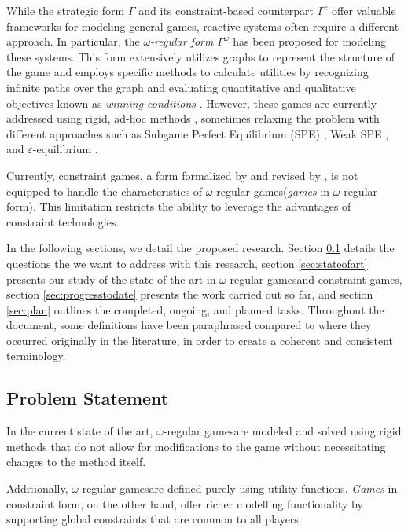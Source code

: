 \documentclass{article}
\makeatletter
\newcommand{\wregularform}{$\omega$-regular form\@ifnextchar{,}{}{\@ifnextchar{.}{}{ }}}
\newcommand{\wregulargames}{$\omega$-regular games\@ifnextchar{,}{}{\@ifnextchar{.}{}{ }}}
\newcommand{\constraintform}{constraint form\@ifnextchar{,}{}{\@ifnextchar{.}{}{ }}}
\newcommand{\constraintgames}{constraint games\@ifnextchar{,}{}{\@ifnextchar{.}{}{ }}}
\makeatother
\begin{document}
While the strategic form $\Gamma$ and its constraint-based counterpart $\Gamma^c$ offer valuable frameworks for modeling general games, reactive systems often require a different approach. In particular, the \textit{\wregularform} $\Gamma^\omega$ \cite{BruyereVeronique2022AGAf} has been proposed for modeling these systems. This form extensively utilizes graphs to represent the structure of the game and employs specific methods to calculate utilities by recognizing infinite paths over the graph and evaluating quantitative and qualitative objectives known as \textit{winning conditions} \cite{ChatterjeeKrishnendu2012Asos, Erich2008SCaA}. However, these games are currently addressed using rigid, ad-hoc methods \cite{SohailSaqib2013Sfat, aggarwal:2023}, sometimes relaxing the problem with different approaches such as Subgame Perfect Equilibrium (SPE) \cite{LéonardBrice2022TCoS}, Weak SPE \cite{BruyereVeronique2021Oteo}, and $\varepsilon$-equilibrium \cite{FleschJános2023Eits}.

Currently, \constraintgames, a form formalized by \cite{nguyen:2015} and revised by \cite{palmieri:2019}, is not equipped to handle the characteristics of \wregulargames (\textit{games} in \wregularform). This limitation restricts the ability to leverage the advantages of constraint technologies.

In the following sections, we detail the proposed research. Section \ref{sec:problemstatement} details the questions the we want to address with this research, section \ref{sec:stateofart} presents our study of the state of the art in \wregulargames and \constraintgames, section \ref{sec:progresstodate} presents the work carried out so far, and section \ref{sec:plan} outlines the completed, ongoing, and planned tasks. Throughout the document, some definitions have been paraphrased compared to where they occurred originally in the literature, in order to create a coherent and consistent terminology.

\subsection{Problem Statement}\label{sec:problemstatement}

In the current state of the art, \wregulargames are modeled and solved using rigid methods that do not allow for modifications to the game without necessitating changes to the method itself.

Additionally, \wregulargames are defined purely using utility functions. \textit{Games} in \constraintform, on the other hand, offer richer modelling functionality by supporting global constraints that are common to all players.
\end{document}
